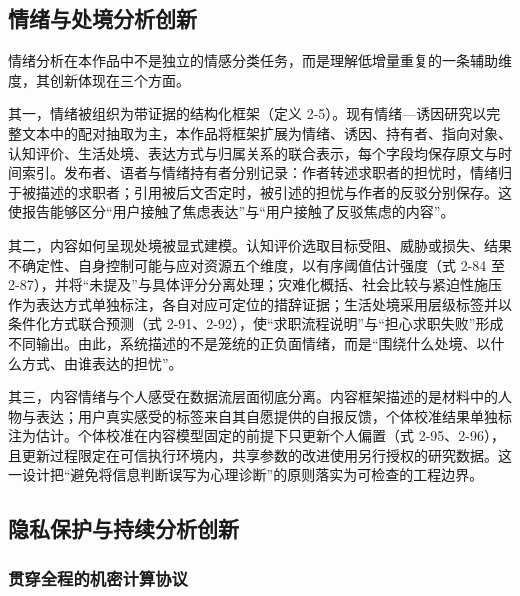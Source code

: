 \subsection{情绪与处境分析创新}\label{section:4.5}

情绪分析在本作品中不是独立的情感分类任务，而是理解低增量重复的一条辅助维度，其创新体现在三个方面。

其一，情绪被组织为带证据的结构化框架（定义 2-5）。现有情绪---诱因研究以完整文本中的配对抽取为主\cite{ref23,ref24}，本作品将框架扩展为情绪、诱因、持有者、指向对象、认知评价、生活处境、表达方式与归属关系的联合表示，每个字段均保存原文与时间索引。发布者、语者与情绪持有者分别记录：作者转述求职者的担忧时，情绪归于被描述的求职者；引用被后文否定时，被引述的担忧与作者的反驳分别保存。这使报告能够区分``用户接触了焦虑表达''与``用户接触了反驳焦虑的内容''。

其二，内容如何呈现处境被显式建模。认知评价选取目标受阻、威胁或损失、结果不确定性、自身控制可能与应对资源五个维度，以有序阈值估计强度（式 2-84 至 2-87），并将``未提及''与具体评分分离处理\cite{ref27}；灾难化概括、社会比较与紧迫性施压作为表达方式单独标注，各自对应可定位的措辞证据；生活处境采用层级标签并以条件化方式联合预测（式 2-91、2-92），使``求职流程说明''与``担心求职失败''形成不同输出。由此，系统描述的不是笼统的正负面情绪，而是``围绕什么处境、以什么方式、由谁表达的担忧''。

其三，内容情绪与个人感受在数据流层面彻底分离。内容框架描述的是材料中的人物与表达；用户真实感受的标签来自其自愿提供的自报反馈，个体校准结果单独标注为估计。个体校准在内容模型固定的前提下只更新个人偏置（式 2-95、2-96），且更新过程限定在可信执行环境内，共享参数的改进使用另行授权的研究数据。这一设计把``避免将信息判断误写为心理诊断''的原则落实为可检查的工程边界。

\subsection{隐私保护与持续分析创新}\label{section:4.6}

\subsubsection{贯穿全程的机密计算协议}\label{section:4.6.1}

